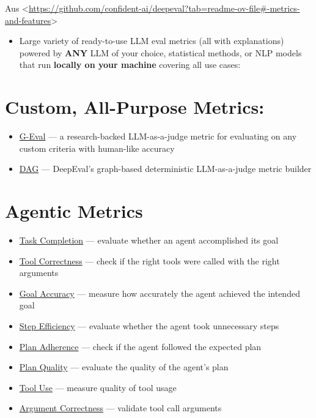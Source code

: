 \documentclass[
  letterpaper,
  DIV=11,
  numbers=noendperiod,
  oneside]{scrreprt}
\providecommand{\tightlist}{%
  \setlength{\itemsep}{0pt}\setlength{\parskip}{0pt}}
\begin{document}
\begin{tcolorbox}
Aus
\textless{}\url{https://github.com/confident-ai/deepeval?tab=readme-ov-file\#-metrics-and-features}\textgreater{}

\begin{itemize}
\tightlist
\item
  Large variety of ready-to-use LLM eval metrics (all with explanations)
  powered by \textbf{ANY} LLM of your choice, statistical methods, or
  NLP models that run \textbf{locally on your machine} covering all use
  cases:
\end{itemize}

\section{Custom, All-Purpose Metrics:}\label{custom-all-purpose-metrics}

\begin{itemize}
\item
  \href{https://deepeval.com/docs/metrics-llm-evals}{G-Eval} --- a
  research-backed LLM-as-a-judge metric for evaluating on any custom
  criteria with human-like accuracy
\item
  \href{https://deepeval.com/docs/metrics-dag}{DAG} --- DeepEval's
  graph-based deterministic LLM-as-a-judge metric builder
\end{itemize}

\section{Agentic Metrics}\label{agentic-metrics}

\begin{itemize}
\item
  \href{https://deepeval.com/docs/metrics-task-completion}{Task
  Completion} --- evaluate whether an agent accomplished its goal
\item
  \href{https://deepeval.com/docs/metrics-tool-correctness}{Tool
  Correctness} --- check if the right tools were called with the right
  arguments
\item
  \href{https://deepeval.com/docs/metrics-goal-accuracy}{Goal Accuracy}
  --- measure how accurately the agent achieved the intended goal
\item
  \href{https://deepeval.com/docs/metrics-step-efficiency}{Step
  Efficiency} --- evaluate whether the agent took unnecessary steps
\item
  \href{https://deepeval.com/docs/metrics-plan-adherence}{Plan
  Adherence} --- check if the agent followed the expected plan
\item
  \href{https://deepeval.com/docs/metrics-plan-quality}{Plan Quality}
  --- evaluate the quality of the agent's plan
\item
  \href{https://deepeval.com/docs/metrics-tool-use}{Tool Use} ---
  measure quality of tool usage
\item
  \href{https://deepeval.com/docs/metrics-argument-correctness}{Argument
  Correctness} --- validate tool call arguments
\end{itemize}


\end{tcolorbox}
\end{document}
